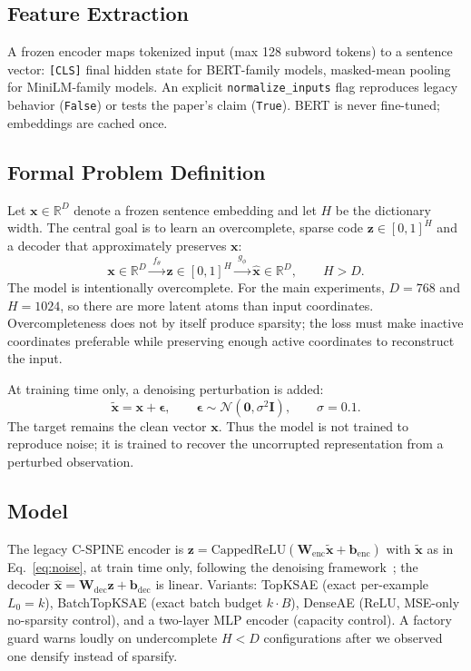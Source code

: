 \documentclass[conference]{IEEEtran}
\begin{document}
\subsection{Feature Extraction}
A frozen encoder maps tokenized input (max 128 subword tokens) to a
sentence vector: \texttt{[CLS]} final hidden state for BERT-family models,
masked-mean pooling for MiniLM-family models. An explicit
\texttt{normalize\_inputs} flag reproduces legacy behavior
(\texttt{False}) or tests the paper's claim (\texttt{True}).
BERT is never fine-tuned; embeddings are cached once.

\subsection{Formal Problem Definition}
Let $\mathbf{x}\in\mathbb{R}^D$ denote a frozen sentence embedding and let
$H$ be the dictionary width. The central goal is to learn an overcomplete,
sparse code $\mathbf{z}\in[0,1]^H$ and a decoder that approximately
preserves $\mathbf{x}$:
\begin{equation}
\mathbf{x}\in\mathbb{R}^D \xrightarrow{\;f_\theta\;} \mathbf{z}\in[0,1]^H
\xrightarrow{\;g_\phi\;} \hat{\mathbf{x}}\in\mathbb{R}^D, \qquad H>D.
\label{eq:pipeline}
\end{equation}
The model is intentionally overcomplete. For the main experiments, $D=768$
and $H=1024$, so there are more latent atoms than input coordinates.
Overcompleteness does not by itself produce sparsity; the loss must make
inactive coordinates preferable while preserving enough active coordinates
to reconstruct the input.

At training time only, a denoising perturbation is added:
\begin{equation}
\tilde{\mathbf{x}} = \mathbf{x} + \boldsymbol{\epsilon}, \qquad
\boldsymbol{\epsilon}\sim\mathcal{N}(\mathbf{0},\sigma^2\mathbf{I}), \qquad
\sigma=0.1.
\label{eq:noise}
\end{equation}
The target remains the clean vector $\mathbf{x}$. Thus the model is not
trained to reproduce noise; it is trained to recover the uncorrupted
representation from a perturbed observation.

\subsection{Model}
The legacy C-SPINE encoder is $\mathbf{z}=\mathrm{CappedReLU}
(\mathbf{W}_{\mathrm{enc}}\tilde{\mathbf{x}}+\mathbf{b}_{\mathrm{enc}})$
with $\tilde{\mathbf{x}}$ as in Eq.~\eqref{eq:noise}, at train time only,
following the denoising framework~\cite{vincent2008extracting}; the decoder
$\hat{\mathbf{x}}=\mathbf{W}_{\mathrm{dec}}\mathbf{z}+\mathbf{b}_{\mathrm{dec}}$
is linear. Variants: TopKSAE (exact per-example $L_0=k$), BatchTopKSAE
(exact batch budget $k\cdot B$), DenseAE (ReLU, MSE-only no-sparsity
control), and a two-layer MLP encoder (capacity control). A factory guard
warns loudly on undercomplete $H<D$ configurations after we observed one
densify instead of sparsify.
\end{document}
